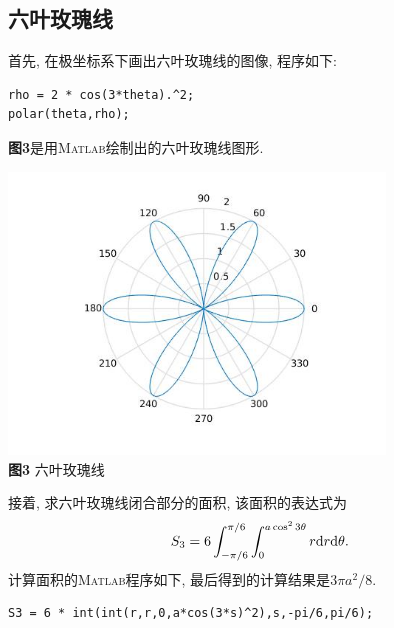 \documentclass[a4paper,12pt]{article}
\begin{document}
\begin{CJK*}{UTF8}{gbsn}
\section{六叶玫瑰线}
首先, 在极坐标系下画出六叶玫瑰线的图像, 程序如下:\vspace{-15pt}
\begin{lstlisting}
rho = 2 * cos(3*theta).^2;
polar(theta,rho);
\end{lstlisting}\par\vspace{10pt}
\textbf{图3}是用\textsc{Matlab}绘制出的六叶玫瑰线图形.\vspace{-5pt}
\begin{center}
\includegraphics[width = 10cm]{six_leaf_rose_curve.jpg}\\
\vspace{-15pt}\textbf{图3} 六叶玫瑰线\\
\end{center}\vspace{5pt}
接着, 求六叶玫瑰线闭合部分的面积, 该面积的表达式为
\begin{equation*}
S_3=6\int_{-\pi/6}^{\pi/6}\int_{0}^{a\cos^2{3\theta}}r{\rm d}r{\rm d}\theta.
\end{equation*}
计算面积的\textsc{Matlab}程序如下, 最后得到的计算结果是$3\pi a^2/8$.\vspace{-15pt}
\begin{lstlisting}
S3 = 6 * int(int(r,r,0,a*cos(3*s)^2),s,-pi/6,pi/6);
\end{lstlisting}\par


\end{CJK*}
\end{document}
